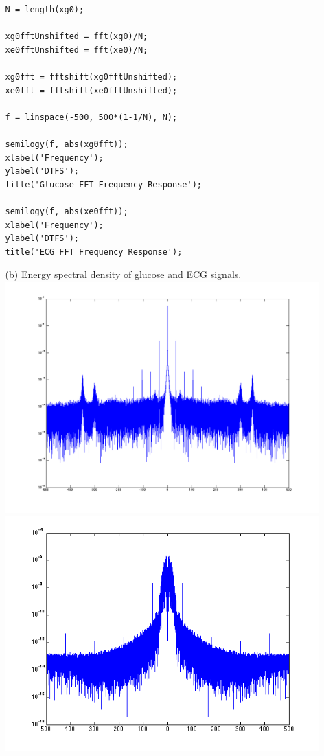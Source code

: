 \documentclass{article}
\begin{document}
\begin{enumerate}
\begin{enumerate}
 \bigskip
 
\begin{lstlisting}   
N = length(xg0);

xg0fftUnshifted = fft(xg0)/N;
xe0fftUnshifted = fft(xe0)/N;

xg0fft = fftshift(xg0fftUnshifted);
xe0fft = fftshift(xe0fftUnshifted);

f = linspace(-500, 500*(1-1/N), N);

semilogy(f, abs(xg0fft));
xlabel('Frequency');
ylabel('DTFS');
title('Glucose FFT Frequency Response');

semilogy(f, abs(xe0fft));
xlabel('Frequency');
ylabel('DTFS');
title('ECG FFT Frequency Response');
\end{lstlisting}

\newpage

	\item[(b)]
	Energy spectral density of glucose and ECG signals.\\
	
	\includegraphics[width=\linewidth/2]{../images/P1_EDGlucose} \includegraphics[width=\linewidth/2]{../images/P1_EDECG}\\


\end{enumerate}
\end{enumerate}
\end{document}

